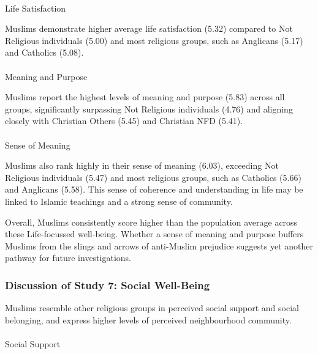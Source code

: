 \documentclass[
  single column]{article}
\makeatletter
\let\oldparagraph\paragraph
\renewcommand{\paragraph}{
    \@ifstar
      \xxxParagraphStar
      \xxxParagraphNoStar
  }
\newcommand{\xxxParagraphStar}[1]{\oldparagraph*{#1}\mbox{}}
\newcommand{\xxxParagraphNoStar}[1]{\oldparagraph{#1}\mbox{}}
\makeatother
\begin{document}
\paragraph{Life Satisfaction}\label{life-satisfaction}

Muslims demonstrate higher average life satisfaction (5.32) compared to
Not Religious individuals (5.00) and most religious groups, such as
Anglicans (5.17) and Catholics (5.08).

\paragraph{Meaning and Purpose}\label{meaning-and-purpose}

Muslims report the highest levels of meaning and purpose (5.83) across
all groups, significantly surpassing Not Religious individuals (4.76)
and aligning closely with Christian Others (5.45) and Christian NFD
(5.41).

\paragraph{Sense of Meaning}\label{sense-of-meaning}

Muslims also rank highly in their sense of meaning (6.03), exceeding Not
Religious individuals (5.47) and most religious groups, such as
Catholics (5.66) and Anglicans (5.58). This sense of coherence and
understanding in life may be linked to Islamic teachings and a strong
sense of community.

Overall, Muslims consistently score higher than the population average
across these Life-focussed well-being. Whether a sense of meaning and
purpose buffers Muslims from the slings and arrows of anti-Muslim
prejudice suggests yet another pathway for future investigations.

\subsubsection{Discussion of Study 7: Social
Well-Being}\label{discussion-of-study-7-social-well-being}

Muslims resemble other religious groups in perceived social support and
social belonging, and express higher levels of perceived neighbourhood
community.

\paragraph{Social Support}\label{social-support}
\end{document}
